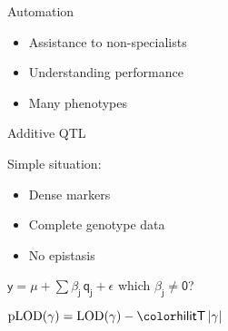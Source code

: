 \documentclass[aspectratio=169,12pt,t]{beamer}
\newcommand{\lod}{\text{LOD}}
\newcommand{\plod}{\text{pLOD}}
\begin{document}
\begin{frame}{Automation}


\hfill \begin{minipage}{10in}
\begin{itemize}
\itemsep24pt

\item Assistance to non-specialists

\item Understanding performance

\item Many phenotypes

\end{itemize}
\end{minipage}


\end{frame}






\begin{frame}{Additive QTL}


\hfill \begin{minipage}{10in}

Simple situation:

\lolit
\begin{itemize}
\item Dense markers
\item Complete genotype data
\item No epistasis

\end{itemize}

\vspace{2cm}

\centerline{
$\mathsf{y  = \mu + \sum \beta_j \, q_j + \epsilon}$ \hspace{1cm}
       {\hilit which $\mathsf{\beta_j \ne 0}$?}
}

\vspace{2cm}

{\color{myyellow}
$\mathsf{ \plod(\gamma) = \lod(\gamma) -
    {\hilit T} \, |\gamma| }$
}


\end{minipage}

\end{frame}
\end{document}
